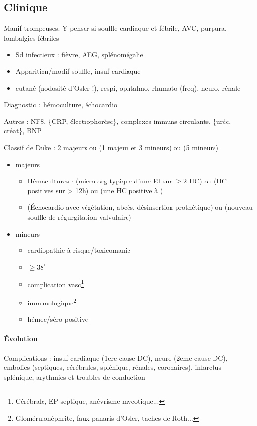 \documentclass{article}
\begin{document}
\subsection{Clinique}
\danger Manif trompeuses. Y penser si souffle cardiaque et fébrile, AVC,
purpura, lombalgies fébriles

\begin{itemize}
  \item Sd infectieux : fièvre, AEG, splénomégalie
  \item Apparition/modif souffle, insuf cardiaque
  \item cutané (nodosité d'Osler !), respi, ophtalmo, rhumato (freq), neuro,
    rénale
\end{itemize}

Diagnostic : hémoculture, échocardio

Autres : NFS, \{CRP, électrophorèse\}, complexes immuns circulants, \{urée,
créat\}, BNP

Classif de Duke : 2 majeurs ou (1 majeur et 3 mineurs) ou (5 mineurs)
\begin{itemize}
  \item majeurs
    \begin{itemize}
      \item Hémocultures : (micro-org typique d'une EI sur $\ge 2$ HC) ou (HC
        positives sur > 12h) ou (une HC positive à )
      \item (Échocardio avec végétation, abcès, désinsertion prothétique) ou (nouveau souffle de régurgitation valvulaire)
    \end{itemize}
  \item mineurs
    \begin{itemize}
      \item cardiopathie à risque/toxicomanie
      \item $\ge 38^{\circ}$
      \item complication vasc\footnote{Cérébrale, EP septique, anévrisme mycotique...}
      \item immunologique\footnote{Glomérulonéphrite, faux panaris d'Osler,
          taches de Roth...}
      \item hémoc/séro positive
    \end{itemize}
\end{itemize}

\paragraph{Évolution}
Complications : insuf cardiaque (1ere cause DC), neuro (2eme cause DC), embolies (septiques,
cérébrales, splénique, rénales, coronaires), infarctus splénique, arythmies et
troubles de conduction
\end{document}
